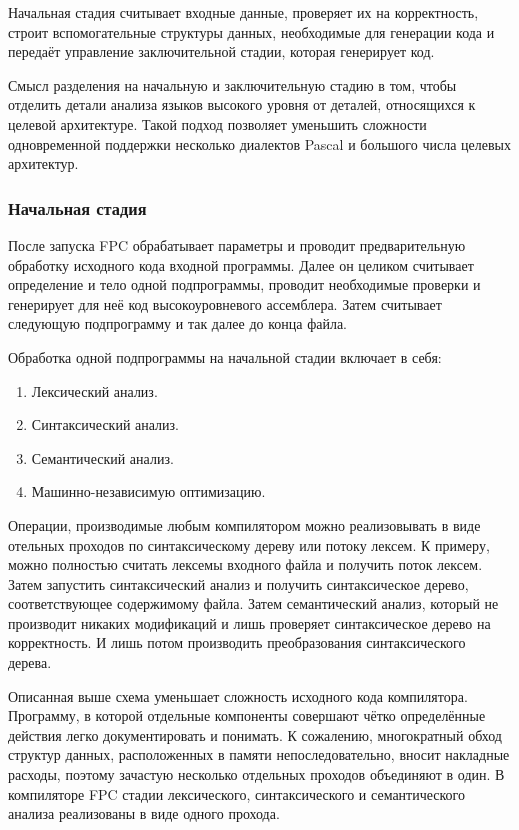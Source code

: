 \documentclass{imcs}
\begin{document}
Начальная стадия считывает входные данные, проверяет их на корректность, строит
вспомогательные структуры данных, необходимые для генерации кода и передаёт 
управление заключительной стадии, которая генерирует код.

Смысл разделения на начальную и заключительную стадию в
том, чтобы отделить детали анализа языков высокого уровня от деталей,
относящихся к целевой архитектуре. Такой подход позволяет уменьшить сложности
одновременной поддержки несколько диалектов Pascal и большого числа целевых
архитектур.

\subsubsection{Начальная стадия}

После запуска FPC обрабатывает параметры и проводит предварительную обработку
исходного кода входной программы. Далее он целиком считывает определение и тело
одной подпрограммы, проводит необходимые проверки и генерирует для неё
код высокоуровневого ассемблера. Затем считывает следующую подпрограмму и так далее
до конца файла.

Обработка одной подпрограммы на начальной стадии включает в себя:
\begin{enumerate}
    \item Лексический анализ.
    \item Синтаксический анализ.
    \item Семантический анализ.
    \item Машинно-независимую оптимизацию.
\end{enumerate}

Операции, производимые любым компилятором можно реализовывать в виде
отельных проходов по синтаксическому дереву или потоку лексем. К примеру, можно
полностью считать лексемы входного файла и получить поток лексем. Затем запустить
синтаксический анализ и получить синтаксическое дерево, соответствующее содержимому
файла. Затем семантический анализ, который не производит никаких модификаций и 
лишь проверяет синтаксическое дерево на корректность. И лишь потом производить
преобразования синтаксического дерева.

Описанная выше схема уменьшает сложность исходного кода компилятора. Программу, в которой отдельные 
компоненты совершают чётко определённые действия легко документировать и понимать.
К сожалению, многократный обход структур данных, расположенных в памяти непоследовательно,
вносит накладные расходы\cite{kaspersky}, поэтому
зачастую несколько отдельных проходов объединяют в один. В компиляторе FPC стадии
лексического, синтаксического и семантического анализа реализованы в виде одного
прохода. 
\end{document}
